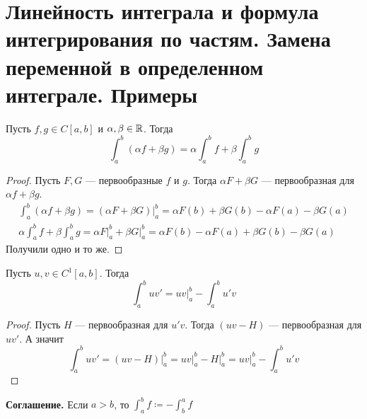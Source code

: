 \section{Линейность интеграла и формула интегрирования по частям. Замена переменной в определенном интеграле. Примеры}

\begin{theorem}
    Пусть $f, g \in C[a, b]$ и $\alpha, \beta \in \mathbb{R}$. Тогда
    \begin{equation*}
    \int_{a}^{b}(\alpha f + \beta g) = \alpha \int_{a}^{b} f + \beta \int_{a}^{b} g
    \end{equation*}
\end{theorem}
\begin{proof}
    Пусть $F, G$ --- первообразные $f$ и $g$. Тогда $\alpha F + \beta G$ --- первообразная для $\alpha f + \beta g$.
    \begin{equation*}
        \begin{gathered}
          \int_{a}^{b}(\alpha f + \beta g) =
          (\alpha F + \beta G) \big|_{a}^{b} =
          \alpha F(b) + \beta G(b) - \alpha F(a) - \beta G(a)\\
          \alpha \int_{a}^{b} f + \beta \int_{a}^{b} g =
          \alpha F \big|_a^{b} + \beta G \big|_{a}^{b} =
          \alpha F(b) - \alpha F(a) + \beta G(b) - \beta G(a)
        \end{gathered}
    \end{equation*}
    Получили одно и то же.
\end{proof}

\begin{theorem}
    Пусть $u, v \in C^{1}[a, b]$. Тогда
    \begin{equation*}
        \int_{a}^{b} uv' = uv \big|_{a}^{b} - \int_{a}^{b} u'v
    \end{equation*}
\end{theorem}
\begin{proof}
  Пусть $H$ --- первообразная для $u'v$. Тогда $(uv - H)$ --- первообразная для $uv'$. А значит
  \begin{equation*}
    \int_{a}^{b} uv' = (uv - H) \big|_{a}^{b} = uv \big|_{a}^{b} - H \big|_{a}^{b} = uv|_{a}^{b} - \int_{a}^{b} u'v
  \end{equation*}
\end{proof}

\textbf{Соглашение.} Если $a > b$, то $\displaystyle \int_{a}^{b} f \coloneqq -\int_{b}^{a} f$

